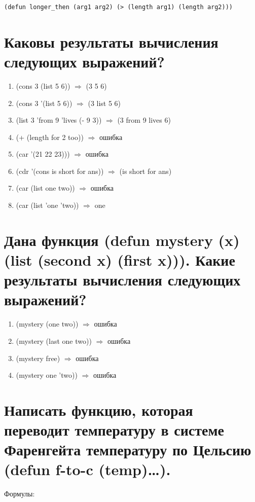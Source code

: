 \begin{lstlisting}[label=lst:task_5, caption=Задание 5.]
	(defun longer_then (arg1 arg2) (> (length arg1) (length arg2)))
\end{lstlisting}

\section{Каковы результаты вычисления следующих выражений?}

\begin{enumerate}
	\item (cons 3 (list 5 6)) $\Rightarrow$ (3 5 6)
	\item (cons 3 '(list 5 6)) $\Rightarrow$ (3 list 5 6)
	\item (list 3 'from 9 'lives (- 9 3)) $\Rightarrow$ (3 from 9 lives 6)
	\item (+ (length for 2 too)) $\Rightarrow$ ошибка 
	\item (car '(21 22 23))) $\Rightarrow$ ошибка 
	\item (cdr '(cons is short for ans)) $\Rightarrow$ (is short for ans)
	\item (car (list one two)) $\Rightarrow$ ошибка
	\item (car (list 'one 'two)) $\Rightarrow$ one
\end{enumerate}

\newpage
\section{Дана функция (defun mystery (x) (list (second x) (first x))). Какие результаты вычисления следующих выражений?}
\begin{enumerate}
	\item (mystery (one two)) $\Rightarrow$ ошибка
	\item (mystery (last one two)) $\Rightarrow$ ошибка
	\item (mystery free) $\Rightarrow$ ошибка
	\item (mystery one 'two)) $\Rightarrow$ ошибка
\end{enumerate}

\section{Написать функцию, которая переводит температуру в системе Фаренгейта температуру по Цельсию (defun f-to-c (temp)…).}

Формулы:

